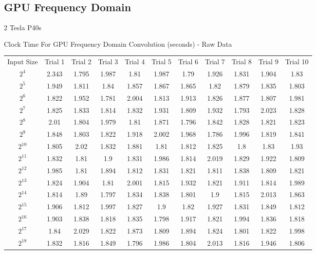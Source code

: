 \subsection{GPU Frequency Domain}
\begin{center}
    2 Tesla P40s
    
    Clock Time For GPU Frequency Domain Convolution (seconds) - Raw Data
    
    \begin{tabular}{c|c|c|c|c|c|c|c|c|c|c}
     Input Size & Trial 1 & Trial 2 & Trial 3 & Trial 4 & Trial 5 & Trial 6 & Trial 7 & Trial 8 & Trial 9 & Trial 10 \\
$2^{4}$ & 2.343 & 1.795 & 1.987 & 1.81 & 1.987 & 1.79 & 1.926 & 1.831 & 1.904 & 1.83 \\
$2^{5}$ & 1.949 & 1.811 & 1.84 & 1.857 & 1.867 & 1.865 & 1.82 & 1.879 & 1.835 & 1.803 \\
$2^{6}$ & 1.822 & 1.952 & 1.781 & 2.004 & 1.813 & 1.913 & 1.826 & 1.877 & 1.807 & 1.981 \\
$2^{7}$ & 1.825 & 1.833 & 1.814 & 1.832 & 1.931 & 1.809 & 1.932 & 1.793 & 2.023 & 1.828 \\
$2^{8}$ & 2.01 & 1.804 & 1.979 & 1.81 & 1.871 & 1.796 & 1.842 & 1.828 & 1.821 & 1.823 \\
$2^{9}$ & 1.848 & 1.803 & 1.822 & 1.918 & 2.002 & 1.968 & 1.786 & 1.996 & 1.819 & 1.841 \\
$2^{10}$ & 1.805 & 2.02 & 1.832 & 1.881 & 1.81 & 1.812 & 1.825 & 1.8 & 1.83 & 1.93 \\
$2^{11}$ & 1.832 & 1.81 & 1.9 & 1.831 & 1.986 & 1.814 & 2.019 & 1.829 & 1.922 & 1.809 \\
$2^{12}$ & 1.985 & 1.81 & 1.894 & 1.812 & 1.831 & 1.821 & 1.811 & 1.838 & 1.809 & 1.821 \\
$2^{13}$ & 1.824 & 1.904 & 1.81 & 2.001 & 1.815 & 1.932 & 1.821 & 1.911 & 1.814 & 1.989 \\
$2^{14}$ & 1.814 & 1.89 & 1.797 & 1.834 & 1.838 & 1.801 & 1.9 & 1.815 & 2.013 & 1.863 \\
$2^{15}$ & 1.906 & 1.812 & 1.997 & 1.827 & 1.9 & 1.82 & 1.927 & 1.831 & 1.849 & 1.812 \\
$2^{16}$ & 1.903 & 1.838 & 1.818 & 1.835 & 1.798 & 1.917 & 1.821 & 1.994 & 1.836 & 1.818 \\
$2^{17}$ & 1.84 & 2.029 & 1.822 & 1.873 & 1.809 & 1.894 & 1.824 & 1.801 & 1.822 & 1.998 \\
$2^{18}$ & 1.832 & 1.816 & 1.849 & 1.796 & 1.986 & 1.804 & 2.013 & 1.816 & 1.946 & 1.806 \\

\end{tabular}
\end{center}
